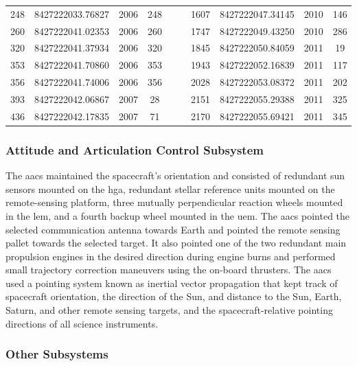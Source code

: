 \documentclass{article}
\theoremstyle{mystyle}
\begin{document}
\begin{table}[H]
\begin{tabular}{|c c c c c | c c c c c|}
         248    & 8427222033.76827  & 2006  & 248 & & & 1607 & 8427222047.34145 & 2010 & 146 \\
         260    & 8427222041.02353  & 2006  & 260 & & & 1747 & 8427222049.43250 & 2010 & 286 \\
         320    & 8427222041.37934  & 2006  & 320 & & & 1845 & 8427222050.84059 & 2011 &  19 \\
         353    & 8427222041.70860  & 2006  & 353 & & & 1943 & 8427222052.16839 & 2011 & 117 \\
         356    & 8427222041.74006  & 2006  & 356 & & & 2028 & 8427222053.08372 & 2011 & 202 \\
         393    & 8427222042.06867  & 2007  &  28 & & & 2151 & 8427222055.29388 & 2011 & 325 \\
         436    & 8427222042.17835  & 2007  &  71 & & & 2170 & 8427222055.69421 & 2011 & 345 \\
         \hline
    \end{tabular}
\end{table}

\subsubsection{\footnotesize Attitude and Articulation Control Subsystem \label{subsubsec:usr_att_and_art_cont_subsye}}

The \gls{aacs} maintained the spacecraft's orientation and consisted of redundant sun sensors mounted on the \gls{hga}, redundant stellar reference units mounted on the remote-sensing platform, three mutually perpendicular reaction wheels mounted in the \gls{lem}, and a fourth backup wheel mounted in the \gls{uem}. The \gls{aacs} pointed the selected communication antenna towards Earth and pointed the remote sensing pallet towards the selected target. It also pointed one of the two redundant main propulsion engines in the desired direction during engine burns and performed small trajectory correction maneuvers using the on-board thrusters. The \gls{aacs} used a pointing system known as \gls{inertial vector propagation} that kept track of spacecraft orientation, the direction of the Sun, and distance to the Sun, Earth, Saturn, and other remote sensing targets, and the spacecraft-relative pointing directions of all science instruments. 

\subsubsection{\footnotesize Other Subsystems \label{subsubsec:usr_other_subsys}}
\end{document}
